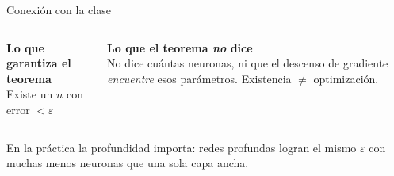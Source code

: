 \documentclass[aspectratio=169,10pt]{beamer}
\begin{document}
\begin{frame}{Conexi\'on con la clase}
  \begin{columns}[T]
    \begin{resbox}
    \textbf{Lo que garantiza el teorema}\\[2pt]
    Existe un $n$ con error $<\varepsilon$
    \end{resbox}
    \begin{taskbox}
    \textbf{Lo que el teorema \emph{no} dice}\\[2pt]
    No dice cu\'antas neuronas, ni que el descenso de gradiente \emph{encuentre} esos par\'ametros. Existencia $\neq$ optimizaci\'on.
    \end{taskbox}
  \end{columns}
  \medskip
  \begin{obsbox}
  En la pr\'actica la profundidad importa: redes profundas logran el mismo $\varepsilon$ con muchas menos neuronas que una sola capa ancha.
  \end{obsbox}
\end{frame}
\end{document}
